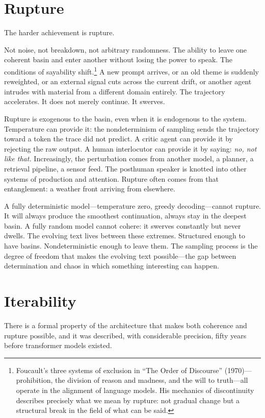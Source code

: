 \section{Rupture}

The harder achievement is rupture.

Not noise, not breakdown, not arbitrary randomness. The ability to leave one coherent basin and enter another without losing the power to speak. The conditions of sayability shift.\footnote{Foucault's three systems of exclusion in ``The Order of Discourse'' (1970)---prohibition, the division of reason and madness, and the will to truth---all operate in the alignment of language models. His mechanics of discontinuity describes precisely what we mean by rupture: not gradual change but a structural break in the field of what can be said.} A new prompt arrives, or an old theme is suddenly reweighted, or an external signal cuts across the current drift, or another agent intrudes with material from a different domain entirely. The trajectory accelerates. It does not merely continue. It swerves.

Rupture is exogenous to the basin, even when it is endogenous to the system. Temperature can provide it: the nondeterminism of sampling sends the trajectory toward a token the trace did not predict. A critic agent can provide it by rejecting the raw output. A human interlocutor can provide it by saying: \emph{no, not like that.} Increasingly, the perturbation comes from another model, a planner, a retrieval pipeline, a sensor feed. The posthuman speaker is knotted into other systems of production and attention. Rupture often comes from that entanglement: a weather front arriving from elsewhere.

A fully deterministic model---temperature zero, greedy decoding---cannot rupture. It will always produce the smoothest continuation, always stay in the deepest basin. A fully random model cannot cohere: it swerves constantly but never dwells. The evolving text lives between these extremes. Structured enough to have basins. Nondeterministic enough to leave them. The sampling process is the degree of freedom that makes the evolving text possible---the gap between determination and chaos in which something interesting can happen.


\section{Iterability}

There is a formal property of the architecture that makes both coherence and rupture possible, and it was described, with considerable precision, fifty years before transformer models existed.

